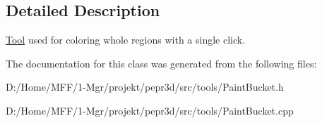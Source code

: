 \subsection{Detailed Description}
\mbox{\hyperlink{classpepr3d_1_1_tool}{Tool}} used for coloring whole regions with a single click. 

The documentation for this class was generated from the following files\+:\begin{DoxyCompactItemize}
\item 
D\+:/\+Home/\+M\+F\+F/1-\/\+Mgr/projekt/pepr3d/src/tools/Paint\+Bucket.\+h\item 
D\+:/\+Home/\+M\+F\+F/1-\/\+Mgr/projekt/pepr3d/src/tools/Paint\+Bucket.\+cpp\end{DoxyCompactItemize}
